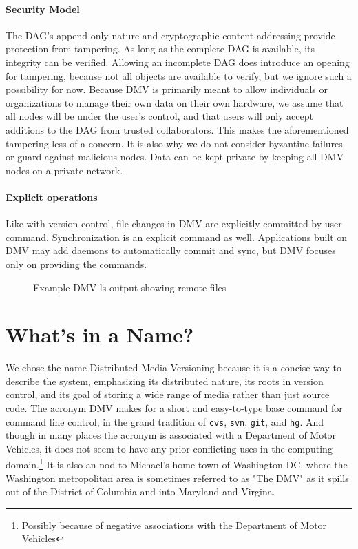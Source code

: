 \paragraph{Security Model}

The DAG's append-only nature and cryptographic content-addressing provide
protection from tampering. As long as the complete DAG is available, its
integrity can be verified. Allowing an incomplete DAG does introduce an opening
for tampering, because not all objects are available to verify, but we ignore
such a possibility for now. Because DMV is primarily meant to allow individuals
or organizations to manage their own data on their own hardware, we assume that
all nodes will be under the user's control, and that users will only accept
additions to the DAG from trusted collaborators. This makes the aforementioned
tampering less of a concern. It is also why we do not consider byzantine
failures or guard against malicious nodes. Data can be kept private by keeping
all DMV nodes on a private network.


\paragraph{Explicit operations}

Like with version control, file changes in DMV are explicitly committed by user
command. Synchronization is an explicit command as well. Applications built on
DMV may add daemons to automatically commit and sync, but DMV focuses only on
providing the commands.


\begin{figure}[h]
    \caption{Example DMV ls output showing remote files}
    
\end{figure}



\section{What's in a Name?}

We chose the name Distributed Media Versioning because it is a concise way to
describe the system, emphasizing its distributed nature, its roots in version
control, and its goal of storing a wide range of media rather than just source
code. The acronym DMV makes for a short and easy-to-type base command for
command line control, in the grand tradition of \lstinline{cvs},
\lstinline{svn}, \lstinline{git}, and \lstinline{hg}. And though in many places
the acronym is associated with a Department of Motor Vehicles, it does not seem
to have any prior conflicting uses in the computing domain.\footnote{Possibly
because of negative associations with the Department of Motor Vehicles} It is
also an nod to Michael's home town of Washington DC, where the Washington
metropolitan area is sometimes referred to as "The DMV" as it spills out of the
District of Columbia and into Maryland and Virgina.
